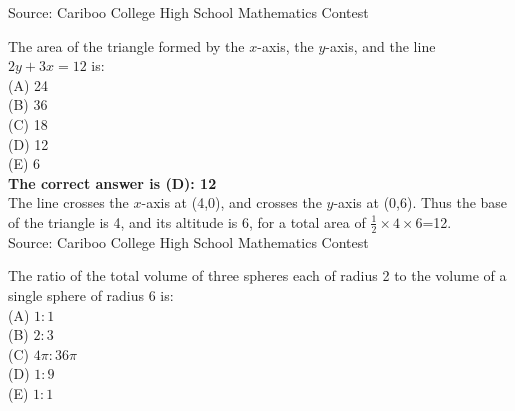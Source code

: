 \documentclass{article}
\begin{document}
\scriptsize
Source: Cariboo College High School Mathematics Contest

\normalsize
The area of the triangle formed by the $x$-axis, the $y$-axis, and the line $2y+3x=12$ is:\\
(A) 24\\
(B) 36\\
(C) 18\\
(D) 12\\
(E) 6\\


\textbf{The correct answer is (D): 12}\\[1 ex]
The line crosses the $x$-axis at (4,0), and crosses the $y$-axis at (0,6). Thus the base of the triangle is 4, and its altitude is 6, for a total area of $\frac{1}{2}\times4\times6$=12.
\\[5 ex]

\scriptsize
Source: Cariboo College High School Mathematics Contest

\normalsize
The ratio of the total volume of three spheres each of radius 2 to the volume of a single sphere of radius 6 is:\\
(A) $1:1$\\
(B) $2:3$\\
(C) $4\pi:36\pi$\\
(D) $1:9$\\
(E) $1:1$\\

\end{document}
